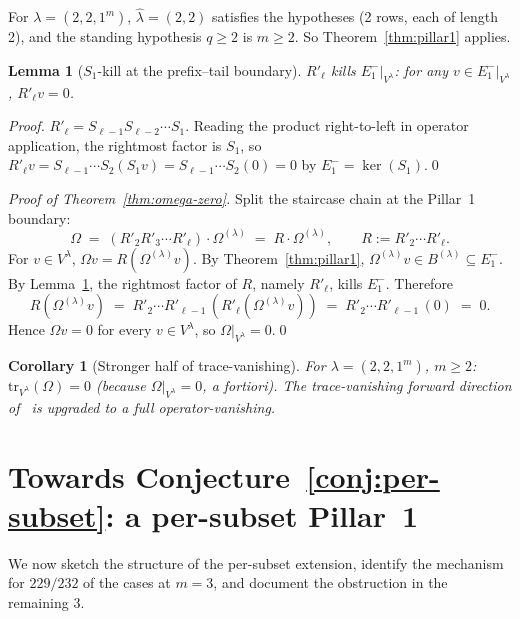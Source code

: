 \documentclass[11pt]{article}
\newtheorem{lemma}[theorem]{Lemma}
\newtheorem{corollary}[theorem]{Corollary}
\theoremstyle{definition}
\newcommand{\Vlam}{V^\lambda}
\newcommand{\Om}{\Omega}
\newcommand{\Omtail}{\Om^{(\lambda)}}
\newcommand{\hatl}{\widehat\lambda}
\newcommand{\Rp}{R'}
\newcommand{\Eminus}[1]{E^-_{#1}}
\begin{document}
For $\lambda = (2,2,1^m)$, $\hatl = (2,2)$ satisfies the hypotheses
(2 rows, each of length 2), and the standing hypothesis $q \ge 2$ is
$m \ge 2$. So Theorem~\ref{thm:pillar1} applies.

\begin{lemma}[$S_1$-kill at the prefix--tail boundary]\label{lem:S1-kill}
$\Rp_\ell$ kills $\Eminus 1|_{\Vlam}$: for any $v \in \Eminus 1|_{\Vlam}$,
$\Rp_\ell v = 0$.
\end{lemma}

\begin{proof}
$\Rp_\ell = S_{\ell-1} S_{\ell-2} \cdots S_1$. Reading the product
right-to-left in operator application, the rightmost factor is $S_1$, so
$\Rp_\ell v = S_{\ell-1}\cdots S_2 (S_1 v) = S_{\ell-1}\cdots S_2 (0) = 0$
by $\Eminus 1 = \ker(S_1)$.\qed
\end{proof}

\begin{proof}[Proof of Theorem~\ref{thm:omega-zero}]
Split the staircase chain at the Pillar~1 boundary:
\[
   \Om \;=\; (\Rp_2 \Rp_3 \cdots \Rp_\ell) \cdot \Omtail
   \;=\; R \cdot \Omtail,
   \qquad R := \Rp_2 \cdots \Rp_\ell.
\]
For $v \in \Vlam$, $\Om v = R(\Omtail v)$. By Theorem~\ref{thm:pillar1},
$\Omtail v \in B^{(\lambda)} \subseteq \Eminus 1$. By
Lemma~\ref{lem:S1-kill}, the rightmost factor of $R$, namely $\Rp_\ell$,
kills $\Eminus 1$. Therefore
\[
   R(\Omtail v) \;=\; \Rp_2 \cdots \Rp_{\ell-1}\,(\Rp_\ell (\Omtail v))
   \;=\; \Rp_2 \cdots \Rp_{\ell-1}\,(0) \;=\; 0.
\]
Hence $\Om v = 0$ for every $v \in \Vlam$, so $\Om|_{\Vlam} = 0$.\qed
\end{proof}

\begin{corollary}[Stronger half of trace-vanishing]\label{cor:strong-tv}
For $\lambda = (2,2,1^m)$, $m \ge 2$:
$\mathrm{tr}_{\Vlam}(\Om) = 0$ (because $\Om|_{\Vlam} = 0$, a fortiori).
The trace-vanishing forward direction of~\cite[\texttt{two-sided-sign-kill}]{memory}
is upgraded to a full operator-vanishing.
\end{corollary}

\section{Towards Conjecture~\ref{conj:per-subset}: a per-subset Pillar~1}
\label{sec:per-subset}

We now sketch the structure of the per-subset extension, identify the
mechanism for $229/232$ of the cases at $m=3$, and document the obstruction
in the remaining $3$.
\end{document}
